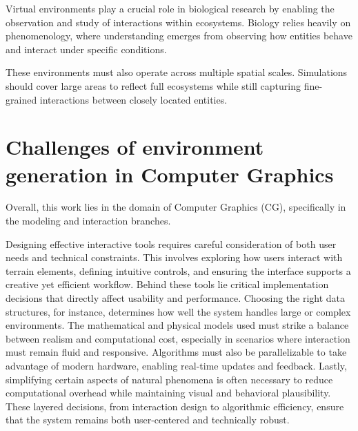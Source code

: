 Virtual environments play a crucial role in biological research by enabling the observation and study of interactions within ecosystems. Biology relies heavily on phenomenology, where understanding emerges from observing how entities behave and interact under specific conditions.


These environments must also operate across multiple spatial scales. Simulations should cover large areas to reflect full ecosystems while still capturing fine-grained interactions between closely located entities.


\section{Challenges of environment generation in Computer Graphics}

Overall, this work lies in the domain of Computer Graphics (CG), specifically in the modeling and interaction branches. 

Designing effective interactive tools requires careful consideration of both user needs and technical constraints. This involves exploring how users interact with terrain elements, defining intuitive controls, and ensuring the interface supports a creative yet efficient workflow. Behind these tools lie critical implementation decisions that directly affect usability and performance. Choosing the right data structures, for instance, determines how well the system handles large or complex environments. The mathematical and physical models used must strike a balance between realism and computational cost, especially in scenarios where interaction must remain fluid and responsive. Algorithms must also be parallelizable to take advantage of modern hardware, enabling real-time updates and feedback. Lastly, simplifying certain aspects of natural phenomena is often necessary to reduce computational overhead while maintaining visual and behavioral plausibility. These layered decisions, from interaction design to algorithmic efficiency, ensure that the system remains both user-centered and technically robust.




